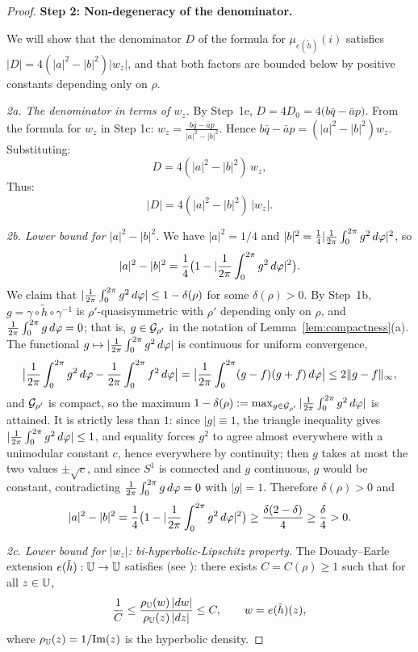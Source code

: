 \begin{proof}
	
	
	\textbf{Step 2: Non-degeneracy of the denominator.}
	
	We will show that the denominator $D$ of the formula for $\mu_{e(\tilde{h})}(i)$ satisfies $|D| = 4(|a|^2 - |b|^2)|w_z|$, and that both factors are bounded below by positive constants depending only on $\rho$.
	
	\medskip
	\noindent\textit{2a. The denominator in terms of $w_z$.}
	By Step~1e, $D=4D_0=4\bigl(b\bar q-\bar ap\bigr)$.
	From the formula for $w_z$ in Step 1c: $w_z = \frac{b\bar{q} - \bar{a}p}{|a|^2 - |b|^2}$. Hence $b\bar{q} - \bar{a}p = (|a|^2 - |b|^2)w_z$. Substituting:
	\[
	D = 4(|a|^2 - |b|^2)\,w_z,
	\]
	Thus:
	\begin{equation}\label{eq:denom}
		|D| = 4(|a|^2 - |b|^2)\,|w_z|.
	\end{equation}
	
	\medskip
	\noindent\textit{2b. Lower bound for $|a|^2-|b|^2$.}
	We have $|a|^2=1/4$ and $|b|^2=\frac14|\frac{1}{2\pi}\int_0^{2\pi} g^2 \,d\varphi|^2$, so
	\[
	|a|^2-|b|^2=\frac14\bigl(1-|\frac{1}{2\pi}\int_0^{2\pi} g^2 \,d\varphi|^2\bigr).
	\]
	We claim that $|\frac{1}{2\pi}\int_0^{2\pi} g^2 \,d\varphi|\le1-\delta(\rho)$ for some $\delta(\rho)>0$. By
	Step~1b, $g=\gamma\circ\tilde h\circ\gamma^{-1}$ is $\rho'$-quasisymmetric
	with $\rho'$ depending only on $\rho$, and $\frac{1}{2\pi}\int_0^{2\pi} g \,d\varphi=0$; that is,
	$g\in\mathcal{G}_{\rho'}$ in the notation of Lemma~\ref{lem:compactness}(a). The
	functional $g\mapsto|\frac{1}{2\pi}\int_0^{2\pi} g^2 \,d\varphi|$ is continuous for uniform convergence,
	\[
	\bigl|\frac{1}{2\pi}\int_0^{2\pi} g^2 \,d\varphi-\frac{1}{2\pi}\int_0^{2\pi} f^2 \,d\varphi\bigr|=\bigl|\frac{1}{2\pi}\int_0^{2\pi} (g-f)(g+f) \,d\varphi\bigr|\le2\|g-f\|_\infty ,
	\]
	and $\mathcal{G}_{\rho'}$ is compact, so the maximum
	$1-\delta(\rho):=\max_{g\in\mathcal{G}_{\rho'}}|\frac{1}{2\pi}\int_0^{2\pi} g^2 \,d\varphi|$ is attained. It is
	strictly less than $1$: since $|g|\equiv1$, the triangle inequality gives
	$|\frac{1}{2\pi}\int_0^{2\pi} g^2 \,d\varphi|\le1$, and equality forces $g^2$ to agree almost everywhere with
	a unimodular constant $c$, hence everywhere by continuity; then $g$ takes at
	most the two values $\pm\sqrt c$, and since $S^1$ is connected and $g$
	continuous, $g$ would be constant, contradicting $\frac{1}{2\pi}\int_0^{2\pi} g \,d\varphi=0$ with $|g|=1$.
	Therefore $\delta(\rho)>0$ and
	\[
	|a|^2-|b|^2=\frac14\bigl(1-|\frac{1}{2\pi}\int_0^{2\pi} g^2 \,d\varphi|^2\bigr)
	\ge\frac{\delta(2-\delta)}4\ge\frac{\delta}{4}>0 .
	\]
	
	\noindent\textit{2c. Lower bound for $|w_z|$: bi-hyperbolic-Lipschitz property.}
	The Douady--Earle extension $e(\tilde{h}): \mathbb{U} \to \mathbb{U}$ satisfies (see \cite[Prop.\ 4.1(3)]{Sh}): there exists $C = C(\rho) \geq 1$ such that for all $z \in \mathbb{U}$,
	\[
	\frac{1}{C} \leq \frac{\rho_{\mathbb{U}}(w)\,|dw|}{\rho_{\mathbb{U}}(z)\,|dz|} \leq C, \qquad w = e(\tilde{h})(z),
	\]
	where $\rho_{\mathbb{U}}(z) = 1/\mathrm{Im}(z)$ is the hyperbolic density.
	

\end{proof}

